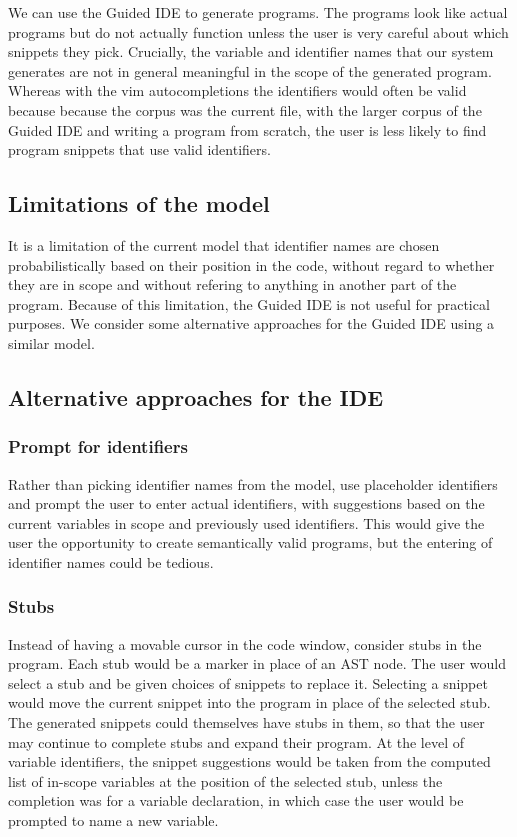 \documentclass[titlepage]{article}
\begin{document}
We can use the Guided IDE to generate programs. The programs look like actual
programs but do not actually function unless the user is very careful about
which snippets they pick. Crucially, the variable and identifier names that our
system generates are not in general meaningful in the scope of the generated
program.  Whereas with the vim autocompletions the identifiers would often be
valid because because the corpus was the current file, with the larger corpus of
the Guided IDE and writing a program from scratch, the user is less likely to
find program snippets that use valid identifiers.

\subsection{Limitations of the model}

It is a limitation of the current model that identifier names are chosen
probabilistically based on their position in the code, without regard to whether
they are in scope and without refering to anything in another part of the
program. Because of this limitation, the Guided IDE is not useful for practical
purposes. We consider some alternative approaches for the Guided IDE using a
similar model.

\subsection{Alternative approaches for the IDE}

\subsubsection{Prompt for identifiers}

Rather than picking identifier names from the model, use placeholder identifiers
and prompt the user to enter actual identifiers, with suggestions based on the
current variables in scope and previously used identifiers. This would give the
user the opportunity to create semantically valid programs, but the entering of
identifier names could be tedious.

\subsubsection{Stubs}

Instead of having a movable cursor in the code window, consider stubs in the
program. Each stub would be a marker in place of an AST node. The user would
select a stub and be given choices of snippets to replace it. Selecting a
snippet would move the current snippet into the program in place of the selected
stub.  The generated snippets could themselves have stubs in them, so that the
user may continue to complete stubs and expand their program.  At the level of
variable identifiers, the snippet suggestions would be taken from the computed
list of in-scope variables at the position of the selected stub, unless the
completion was for a variable declaration, in which case the user would be
prompted to name a new variable.
\end{document}
